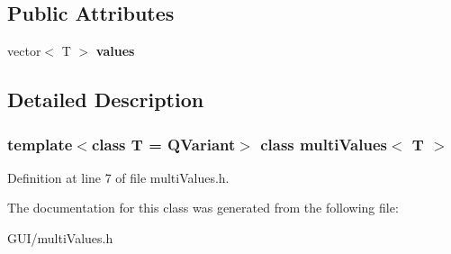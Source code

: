 \subsection*{Public Attributes}
\begin{DoxyCompactItemize}
\item 
\mbox{\label{classmulti_values_a3c2a711c22ad578730c304e6d6861c16}} 
vector$<$ T $>$ {\bfseries values}
\end{DoxyCompactItemize}


\subsection{Detailed Description}
\subsubsection*{template$<$class T = Q\+Variant$>$\newline
class multi\+Values$<$ T $>$}



Definition at line 7 of file multi\+Values.\+h.



The documentation for this class was generated from the following file\+:\begin{DoxyCompactItemize}
\item 
G\+U\+I/multi\+Values.\+h\end{DoxyCompactItemize}

